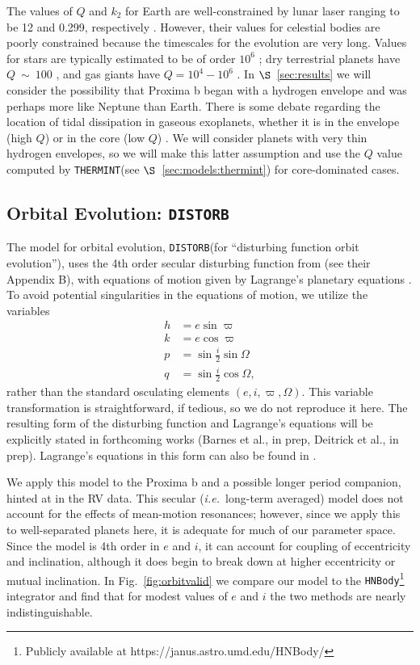 \documentclass[preprint,12pt]{aastex}
\def\eg{{\it e.g.\ }}
\def\ie{{\it i.e.\ }}
\def\distorb{\texttt{\footnotesize{DISTORB}}\xspace}
\def\thermint{\texttt{\footnotesize{THERMINT}}\xspace}
\begin{document}
The values of $Q$ and $k_2$ for Earth are well-constrained by lunar
laser ranging \citep{Dickey94} to be 12 and 0.299, respectively
\citep{Williams78,Yoder95}. However, their values for celestial bodies
are poorly constrained because the timescales for the evolution are
very long. Values for
stars are typically estimated to be of order $10^6$
\citep[\eg][]{Jackson09}; dry terrestrial planets have $Q~\sim~100$
\citep{Yoder95,Henning09}, and gas giants have $Q=10^4-10^6$
\citep{AksnesFranklin01,Jackson08a}. In $\S$~\ref{sec:results} we will
consider the possibility that Proxima b began with a hydrogen envelope
and was perhaps more like Neptune than Earth. There is some debate
regarding the location of tidal dissipation in gaseous exoplanets,
whether it is in the envelope (high $Q$) or in the core (low $Q$)
\citep[\eg][]{StorchLai14}. We will consider planets with very thin
hydrogen envelopes, so we will make this latter assumption and use the $Q$
value computed by \thermint (see $\S$~\ref{sec:models:thermint}) for core-dominated cases.

\subsection{Orbital Evolution: \distorb}
\label{sec:models:distorb}
The model for orbital evolution, \distorb (for ``disturbing function orbit evolution''), 
uses the 4th order secular disturbing function from \cite{MurrayDermott99} 
(see their Appendix B), with equations of motion given by Lagrange's planetary 
equations \citep[again, see][]{MurrayDermott99}.
To avoid potential singularities in the equations of motion, we utilize 
the variables
\begin{align}
h & = e \sin{\varpi} \\
k & = e \cos{\varpi} \\
p & = \sin{\frac{i}{2}} \sin{\Omega} \label{eqnp}\\
q & = \sin{\frac{i}{2}} \cos{\Omega} \label{eqnq},
\end{align}
rather than the standard osculating elements $(e,i,\varpi,\Omega)$. This 
variable transformation is straightforward, if tedious, so we do not 
reproduce it here. The resulting form of the disturbing function and 
Lagrange's equations will be explicitly stated in forthcoming works (Barnes
 et al., in prep, Deitrick et al., in prep). Lagrange's equations in this form 
can also be found in \cite{Berger1991}. 

We apply this model to the Proxima b and a possible longer period
companion, hinted at in the RV data. This secular (\ie long-term
averaged) model does not account for the effects of mean-motion
resonances; however, since we apply this to well-separated planets
here, it is adequate for much of our parameter space. Since the model
is 4th order in $e$ and $i$, it can account for coupling of
eccentricity and inclination, although it does begin to break down at
higher eccentricity or mutual inclination. In
Fig.~\ref{fig:orbitvalid} we compare our model to the
{\footnotesize \texttt{HNBody}}\footnote{Publicly available at
 https://janus.astro.umd.edu/HNBody/}
integrator \citep{RauchHamilton02} and find that for modest values of
$e$ and $i$ the two methods are nearly indistinguishable.
 
\end{document}

